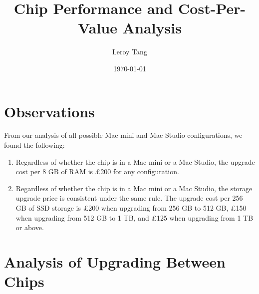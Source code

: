\documentclass[12pt]{article}
\title{Chip Performance and Cost-Per-Value Analysis}
\author{Leroy Tang}
\date{\today}
\begin{document}
\maketitle

\section{Observations}
From our analysis of all possible Mac mini and Mac Studio configurations, we found the following:
\begin{enumerate}
    \item Regardless of whether the chip is in a Mac mini or a Mac Studio, the upgrade cost per 8 GB of RAM is \pounds200 for any configuration.
    \item Regardless of whether the chip is in a Mac mini or a Mac Studio, the storage upgrade price is consistent under the same rule. The upgrade cost per 256 GB of SSD storage is \pounds200 when upgrading from 256 GB to 512 GB, \pounds150 when upgrading from 512 GB to 1 TB, and \pounds125 when upgrading from 1 TB or above.
\end{enumerate}
\section{Analysis of Upgrading Between Chips}
\end{document}
